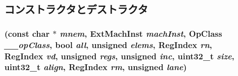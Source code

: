 \subsection{コンストラクタとデストラクタ}
\hypertarget{classArmISA_1_1VldSingleOp_a2047790d9f83b99ba811392cb8b947b4}{
\subsubsection[{VldSingleOp}]{ (const char $\ast$ {\em mnem}, \/  {\bf ExtMachInst} {\em machInst}, \/  OpClass {\em \_\-\_\-opClass}, \/  bool {\em all}, \/  unsigned {\em elems}, \/  {\bf RegIndex} {\em rn}, \/  {\bf RegIndex} {\em vd}, \/  unsigned {\em regs}, \/  unsigned {\em inc}, \/  {\bf uint32\_\-t} {\em size}, \/  {\bf uint32\_\-t} {\em align}, \/  {\bf RegIndex} {\em rm}, \/  unsigned {\em lane})}}
\label{classArmISA_1_1VldSingleOp_a2047790d9f83b99ba811392cb8b947b4}



